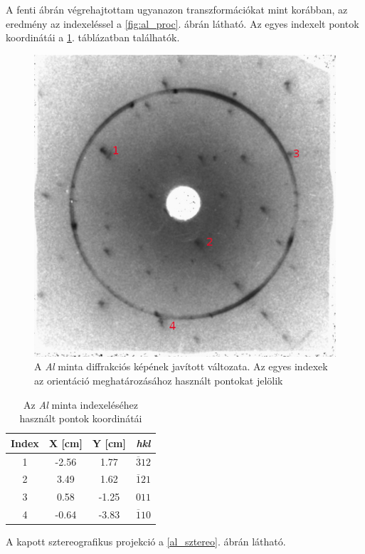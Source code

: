 \documentclass[12pt,a4paper]{article}
\begin{document}
A fenti ábrán végrehajtottam ugyanazon transzformációkat mint korábban, az eredmény az indexeléssel a \ref{fig:al_proc}. ábrán látható. Az egyes indexelt pontok koordinátái a \ref{tab:al}. táblázatban találhatók.
\begin{figure}[!h]
\centering
\includegraphics[scale=1.8]{al_proc}
\caption{A \emph{Al} minta diffrakciós képének javított változata. Az egyes indexek az orientáció meghatározásához használt pontokat jelölik}
\label{al:proc}
\end{figure}
\newpage
\begin{table}[!h]
\begin{center}
\begin{tabular}{|c|c|c|c|}
\hline
Index & X [cm] & Y [cm] & \emph{hkl} \\
\hline
1 & -2.56 & 1.77 & ${\overline{3}12}$\\
\hline
2 & 3.49 & 1.62 & ${\overline{1}21}$\\
\hline
3 & 0.58 & -1.25 & ${011}$\\
\hline
4 & -0.64 & -3.83 & ${\overline{1}10}$\\
\hline
\end{tabular}
\caption{Az \emph{Al} minta indexeléséhez használt pontok koordinátái}
\label{tab:al}
\end{center}
\end{table}
A kapott sztereografikus projekció a \ref{al_sztereo}. ábrán látható.\\
\end{document}
